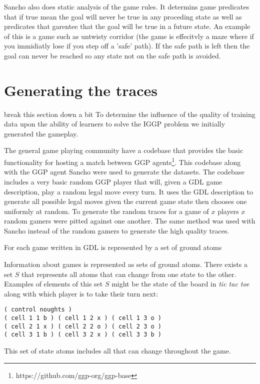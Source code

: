 Sancho also does static analysis of the game rules. It determins game predicates that if true mean the goal will never be true in any proceding state as well as predicates that garentee that the goal will be true in a future state. An example of this is a game such as untwisty corridor (the game is effecitvly a maze where if you immidiatly lose if you step off a 'safe' path). If the safe path is left then the goal can never be reached so any state not on the safe path is avoided.




\section{Generating the traces}
\ac{break this section down a bit}
To determine the influence of the quality of training data upon the ability of learners to solve the IGGP problem we initially generated the gameplay.

The general game playing community have a codebase that provides the basic functionality for hosting a match between GGP agents\footnote{https://github.com/ggp-org/ggp-base}. This codebase along with the GGP agent Sancho were used to generate the datasets. The codebase includes a very basic random GGP player that will, given a GDL game description, play a random legal move every turn. It uses the GDL description to generate all possible legal moves given the current game state then chooses one uniformly at random. To generate the random traces for a game of $x$ players $x$ random gamers were pitted against one another. The same method was used with Sancho instead of the random gamers to generate the high quality traces.

For each game written in GDL is represented by a set of ground atoms

Information about games is represented as sets of ground atoms. There exists a set $S$ that represents all atoms that can change from one state to the other. Examples of elements of this set $S$ might be the state of the board in \textit{tic tac toe} along with which player is to take their turn next:
\begin{verbatim}
( control noughts )
( cell 1 1 b ) ( cell 1 2 x ) ( cell 1 3 o )
( cell 2 1 x ) ( cell 2 2 o ) ( cell 2 3 o )
( cell 3 1 b ) ( cell 3 2 x ) ( cell 3 3 b )
\end{verbatim}
This set of state atoms includes all that can change throughout the game.

